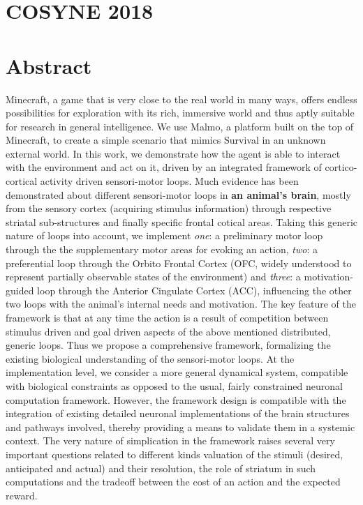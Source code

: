 \documentclass{article}
\begin{document}
\section{COSYNE 2018}

\section{Abstract}

Minecraft, a game that is very close to the real world in many ways, offers endless possibilities for exploration with its rich, immersive world and thus aptly suitable for research in general intelligence. We use Malmo, a platform built on the top of Minecraft, to create a simple scenario that mimics Survival in an unknown external world. In this work, we demonstrate how the agent is able to interact with the environment and act on it, driven by an integrated framework of cortico-cortical activity driven sensori-motor loops. Much evidence has been demonstrated about different sensori-motor loops in \textbf{an animal's brain}, mostly from the sensory cortex (acquiring stimulus information) through respective striatal sub-structures  and finally specific frontal cotical areas. Taking this generic nature of loops into account, we implement \textit{one}: a preliminary motor loop through the the supplementary motor areas for evoking an action, \textit{two}: a preferential loop through the Orbito Frontal Cortex (OFC, widely understood to represent partially observable states of the environment) and \textit{three}: a motivation-guided loop through the Anterior Cingulate Cortex (ACC), influencing the other two loops with the animal's internal needs and motivation. The key feature of the framework is that at any time the action is a result of competition between stimulus driven and goal driven aspects of the above mentioned distributed, generic loops. Thus we propose a comprehensive framework, formalizing the existing biological understanding of the sensori-motor loops. At the implementation level, we consider a more general dynamical system, compatible with biological constraints as opposed to the usual, fairly constrained neuronal computation framework. However, the framework design is compatible with the integration of existing detailed neuronal implementations of the brain structures and pathways involved, thereby providing a means to validate them in a systemic context. The very nature of simplication in the framework raises several very important questions related to different kinds valuation of the stimuli (desired, anticipated and actual) and their resolution, the role of striatum in such computations and the tradeoff between the cost of an action and the expected reward.
\end{document}
